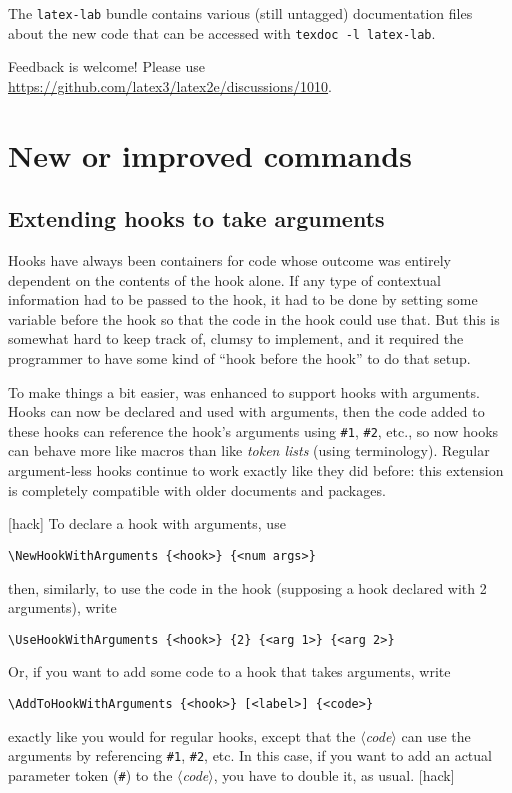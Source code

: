\documentclass{ltnews}
\providecommand\meta[1]{$\langle$\textrm{\itshape#1}$\rangle$}
\begin{document}
The \texttt{latex-lab} bundle contains various 
(still untagged) documentation files about the new code that can
be accessed with \verb|texdoc -l latex-lab|.

Feedback is welcome! 
Please use \url{https://github.com/latex3/latex2e/discussions/1010}.



\section{New or improved commands}

\subsection{Extending hooks to take arguments}

Hooks have always been containers for code whose outcome was entirely
dependent on the contents of the hook alone.  If any type of contextual
information had to be passed to the hook, it had to be done by setting
some variable before the hook so that the code in the hook could use
that.  But this is somewhat hard to keep track of, clumsy to implement,
and it required the programmer to have some kind of \enquote{hook before
the hook} to do that setup.

To make things a bit easier,  was enhanced to support hooks
with arguments.  Hooks can now be declared and used with arguments, then
the code added to these hooks can reference the hook's arguments using
\verb|#1|, \verb|#2|, etc., so now hooks can behave more like macros
than like \emph{token lists} (using  terminology).  Regular
argument-less hooks continue to work exactly like they did before:  this
extension is completely compatible with older documents and packages.

[hack]{\small}
To declare a hook with arguments, use
\begin{verbatim}
\NewHookWithArguments {<hook>} {<num args>}
\end{verbatim}
then, similarly, to use the code in the hook (supposing a hook declared
with 2 arguments), write
\begin{verbatim}
\UseHookWithArguments {<hook>} {2} {<arg 1>} {<arg 2>}
\end{verbatim}

Or, if you want to add some code to a hook that takes arguments, write
\begin{verbatim}
\AddToHookWithArguments {<hook>} [<label>] {<code>}
\end{verbatim}
exactly like you would for regular hooks, except that the \meta{code}
can use the arguments by referencing \verb|#1|, \verb|#2|, etc.  In this
case, if you want to add an actual parameter token (\verb|#|) to the
\meta{code}, you have to double it, as usual.
[hack]
\end{document}

